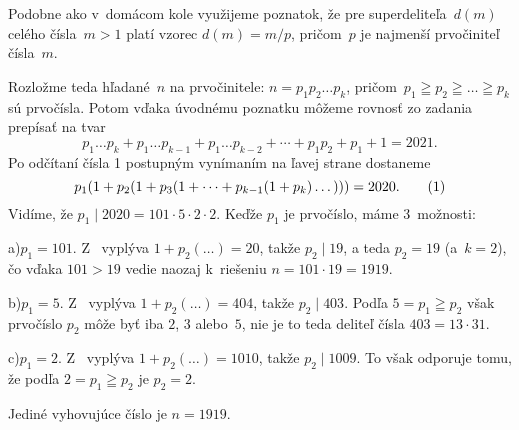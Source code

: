 {%
Podobne ako v~domácom kole využijeme poznatok, že pre
superdeliteľa~$d(m)$ celého čísla~$m>1$ platí vzorec
$d(m)=m/p$, pričom~$p$ je najmenší prvočiniteľ čísla~$m$.


Rozložme teda hľadané~$n$ na prvočinitele: $n=p_1p_2\dots p_k$,
pričom~$p_1\geqq p_2\geqq\dots\geqq p_k$ sú prvočísla.
Potom vďaka úvodnému poznatku môžeme rovnosť zo zadania prepísať na tvar
$$
p_1\dots p_k + p_1\dots p_{k-1} + p_1\dots p_{k-2}+\cdots+p_1p_2
+p_1+1 = 2021.
$$
Po odčítaní čísla 1 postupným vynímaním na ľavej strane dostaneme
$$
p_1(1+p_2(1+p_3(1+\cdots+p_{k-1}(1+p_k)\dots)))=2020.
\tag1$$
Vidíme, že $p_1\mid 2020=101\cdot 5\cdot 2\cdot 2$. Keďže
$p_1$ je prvočíslo, máme 3~možnosti:

\item{a)}$p_1=101$. Z~ vyplýva $1+p_2(\dots)=20$, takže $p_2 \mid 19$,
a teda $p_2=19$ (a~$k=2$), čo vďaka $101>19$ vedie naozaj
k~riešeniu $n=101\cdot 19=1919$.

\item{b)}$p_1=5$. Z~ vyplýva $1+p_2(\dots)=404$, takže $p_2 \mid 403$.
Podľa $5=p_1\geqq p_2$ však prvočíslo $p_2$ môže byť iba $2$, $3$ alebo~$5$,
nie je to teda deliteľ čísla $403=13\cdot31$.

\item{c)}$p_1=2$. Z~ vyplýva $1+p_2(\dots)=1010$, takže $p_2 \mid 1009$.
To však odporuje tomu, že podľa $2=p_1\geqq p_2$ je $p_2=2$.


\Zav Jediné vyhovujúce číslo je $n=1919$.
}

